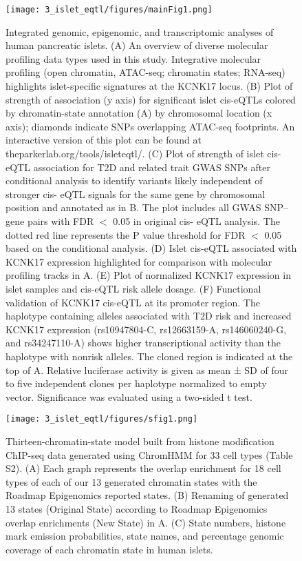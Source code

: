 \begin{figure}
    \centering
    \texttt{[image: 3\_islet\_eqtl/figures/mainFig1.png]}
    \caption[Integrated genomic, epigenomic, and transcriptomic analyses of human pancreatic islets]{Integrated genomic, epigenomic, and transcriptomic analyses of human pancreatic islets. (A) An overview of diverse molecular profiling data types used in this study. Integrative molecular profiling (open chromatin, ATAC-seq; chromatin states; RNA-seq) highlights islet-specific signatures at the KCNK17 locus. (B) Plot of strength of association (y axis) for significant islet cis-eQTLs colored by chromatin-state annotation (A) by chromosomal location (x axis); diamonds indicate SNPs overlapping ATAC-seq footprints. An interactive version of this plot can be found at theparkerlab.org/tools/isleteqtl/. (C) Plot of strength of islet cis-eQTL association for T2D and related trait GWAS SNPs after conditional analysis to identify variants likely independent of stronger cis- eQTL signals for the same gene by chromosomal position and annotated as in B. The plot includes all GWAS SNP–gene pairs with FDR $<$ 0.05 in original cis- eQTL analysis. The dotted red line represents the P value threshold for FDR $<$ 0.05 based on the conditional analysis. (D) Islet cis-eQTL associated with KCNK17 expression highlighted for comparison with molecular profiling tracks in A. (E) Plot of normalized KCNK17 expression in islet samples and cis-eQTL risk allele dosage. (F) Functional validation of KCNK17 cis-eQTL at its promoter region. The haplotype containing alleles associated with T2D risk and increased KCNK17 expression (rs10947804-C, rs12663159-A, rs146060240-G, and rs34247110-A) shows higher transcriptional activity than the haplotype with nonrisk alleles. The cloned region is indicated at the top of A. Relative luciferase activity is given as mean ± SD of four to five independent clones per haplotype normalized to empty vector. Significance was evaluated using a two-sided t test.}
    \label{fig:c2_f1}
\end{figure}


\begin{figure}
    \centering
    \texttt{[image: 3\_islet\_eqtl/figures/sfig1.png]}
    \caption[Thirteen-chromatin-state model]{Thirteen-chromatin-state model built from histone modification ChIP-seq data generated using ChromHMM \cite{ernstMappingAnalysisChromatin2011} for 33 cell types (Table S2). (A) Each graph represents the overlap enrichment for 18 cell types of each of our 13 generated chromatin states with the Roadmap Epigenomics \cite{consortiumIntegrativeAnalysis1112015} reported states. (B) Renaming of generated 13 states (Original State) according to Roadmap Epigenomics overlap enrichments (New State) in A. (C) State numbers, histone mark emission probabilities, state names, and percentage genomic coverage of each chromatin state in human islets.}
    \label{fig:c2_sf1}
\end{figure}

